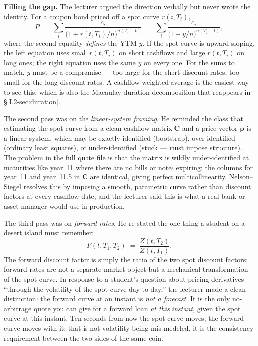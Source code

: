 \begin{tipblock}
\textbf{Filling the gap.} The lecturer argued the direction verbally but never
wrote the identity. For a coupon bond priced off a spot curve $r(t,T_i)$,
\[
  P \;=\; \sum_i \frac{c_i}{\bigl(1+r(t,T_i)/n\bigr)^{n(T_i-t)}}
         \;=\; \sum_i \frac{c_i}{\bigl(1+y/n\bigr)^{n(T_i-t)}},
\]
where the second equality \emph{defines} the YTM $y$. If the spot curve is
upward-sloping, the left equation uses small $r(t,T_i)$ on short cashflows and
large $r(t,T_i)$ on long ones; the right equation uses the same $y$ on every
one. For the sums to match, $y$ must be a compromise --- too large for the
short discount rates, too small for the long discount rates. A
cashflow-weighted average is the easiest way to see this, which is also the
Macaulay-duration decomposition that reappears in \S\ref{L2-sec:duration}.
\end{tipblock}

The second pass was on the \emph{linear-system framing}. He reminded the class
that estimating the spot curve from a clean cashflow matrix $\mathbf{C}$ and a
price vector $\boldsymbol{p}$ is a linear system, which may be exactly
identified (bootstrap), over-identified (ordinary least squares), or
under-identified (stuck --- must impose structure). The problem in the full
quote file is that the matrix is wildly under-identified at maturities like
year~11 where there are no bills or notes expiring: the columns for year~11
and year~11.5 in $\mathbf{C}$ are identical, giving perfect
multicollinearity. Nelson--Siegel resolves this by imposing a smooth,
parametric curve rather than discount factors at every cashflow date, and the
lecturer said this is what a real bank or asset manager would use in
production.

The third pass was on \emph{forward rates}. He re-stated the one thing a
student on a desert island must remember:
\[
    F(t,T_1,T_2) \;=\; \frac{Z(t,T_2)}{Z(t,T_1)}.
\]
The forward discount factor is simply the ratio of the two spot discount
factors; forward rates are not a separate market object but a mechanical
transformation of the spot curve. In response to a student's question about
pricing derivatives ``through the volatility of the spot curve day-to-day,''
the lecturer made a clean distinction: the forward curve at an instant is
\emph{not a forecast}. It is the only no-arbitrage quote you can give for a
forward loan \emph{at this instant}, given the spot curve at this instant. Ten
seconds from now the spot curve moves; the forward curve moves with it; that
is not volatility being mis-modeled, it is the consistency requirement
between the two sides of the same coin.


